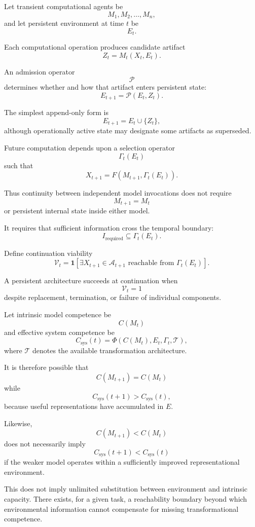 \documentclass[11pt]{article}
\begin{document}
Let transient computational agents be
\[
    M_1,M_2,\ldots,M_n,
\]
and let persistent environment at time \(t\) be
\[
    E_t.
\]

Each computational operation produces candidate artifact
\[
    Z_t
    =
    M_t(X_t,E_t).
\]

An admission operator
\[
    \mathcal{P}
\]
determines whether and how that artifact enters persistent state:
\[
    E_{t+1}
    =
    \mathcal{P}(E_t,Z_t).
\]

The simplest append-only form is
\[
    E_{t+1}
    =
    E_t\cup\{Z_t\},
\]
although operationally active state may designate some artifacts as superseded.

Future computation depends upon a selection operator
\[
    \Gamma_t(E_t)
\]
such that
\[
    X_{t+1}
    =
    F(
        M_{t+1},
        \Gamma_t(E_t)
    ).
\]

Thus continuity between independent model invocations does not require
\[
    M_{t+1}=M_t
\]
or persistent internal state inside either model.

It requires that sufficient information cross the temporal boundary:
\[
    I_{\mathrm{required}}
    \subseteq
    \Gamma_t(E_t).
\]

Define continuation viability
\[
    \mathcal{V}_t
    =
    \mathbf{1}
    \left[
        \exists X_{t+1}
        \in
        \mathcal{A}_{t+1}
        \text{ reachable from }
        \Gamma_t(E_t)
    \right].
\]

A persistent architecture succeeds at continuation when
\[
    \mathcal{V}_t=1
\]
despite replacement, termination, or failure of individual components.

Let intrinsic model competence be
\[
    C(M_t)
\]
and effective system competence be
\[
    C_{\mathrm{sys}}(t)
    =
    \Phi(
        C(M_t),
        E_t,
        \Gamma_t,
        \mathcal{T}
    ),
\]
where \(\mathcal{T}\) denotes the available transformation architecture.

It is therefore possible that
\[
    C(M_{t+1})=C(M_t)
\]
while
\[
    C_{\mathrm{sys}}(t+1)
    >
    C_{\mathrm{sys}}(t),
\]
because useful representations have accumulated in \(E\).

Likewise,
\[
    C(M_{t+1})<C(M_t)
\]
does not necessarily imply
\[
    C_{\mathrm{sys}}(t+1)
    <
    C_{\mathrm{sys}}(t)
\]
if the weaker model operates within a sufficiently improved representational environment.

This does not imply unlimited substitution between environment and intrinsic capacity. There exists, for a given task, a reachability boundary beyond which environmental information cannot compensate for missing transformational competence.
\end{document}
